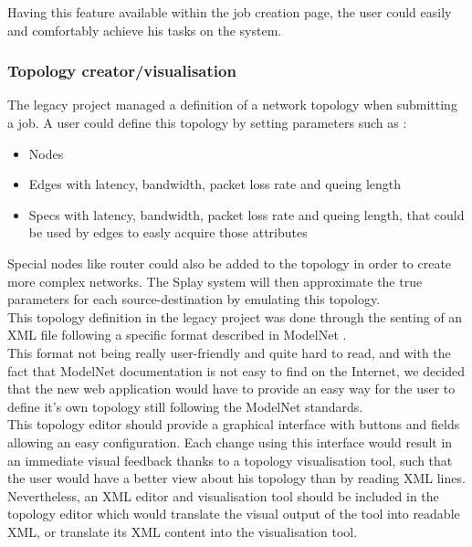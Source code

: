 \documentclass{eplmastersthesis}
\begin{document}
          Having this feature available within the job creation page, the user
          could easily and comfortably achieve his tasks on the system.
          
        \subsubsection{Topology creator/visualisation}

          The legacy project managed a definition of a network topology when
          submitting a job. A user could define this topology by setting
          parameters such as :

          \begin{itemize}
            \item Nodes
            \item Edges with latency, bandwidth, packet loss rate and queing
            length
            \item Specs with latency, bandwidth, packet loss rate and queing
            length, that could be used by edges to easly acquire those
            attributes
          \end{itemize}

          Special nodes like router could also be added to the topology in order
          to create more complex networks. The Splay system will then
          approximate the true parameters for each source-destination by
          emulating this topology.\\

          This topology definition in the legacy project was done through
          the senting of an XML file following a specific format described
          in ModelNet \cite{ModelNet}.\\
          This format not being really user-friendly and quite hard to read,
          and with the fact that ModelNet documentation is not easy to find
          on the Internet, we decided that the new web application would have
          to provide an easy way for the user to define it's own topology
          still following the ModelNet standards.\\

          This topology editor should provide a graphical interface with
          buttons and fields allowing an easy configuration. Each change
          using this interface would result in an immediate visual feedback
          thanks to a topology visualisation tool, such that the user would
          have a better view about his topology than by reading XML lines.
          Nevertheless, an XML editor and visualisation tool should be included
          in the topology editor which would translate the visual output of
          the tool into readable XML, or translate its XML content into the
          visualisation tool.\\
\end{document}
